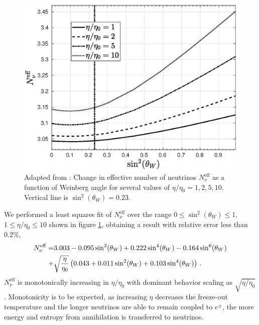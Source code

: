 \begin{figure}[b]
\centerline{\includegraphics[width=0.70\columnwidth]{04-birrell/ParametricStudies/Figures/N_eff2.eps}
}
\caption{Adapted from \cite{Birrell:2014uka}: Change in effective number of neutrinos  $N_\nu^{\mathrm{eff}}$ as a function of Weinberg angle for  several values of $\eta/\eta_0=1,2,5,10$. Vertical line is $\sin^2(\theta_W)=0.23$.}
\label{N_nu_params}  
 \end{figure}
We performed a least squares fit of $N_\nu^{\mathrm{eff}}$ over the range $0\leq \sin^2(\theta_W)\leq 1$, $1\leq \eta/\eta_0\leq 10$ shown in figure \ref{N_nu_params}, obtaining a result with relative error less than $0.2\%$,
\begin{align}
N_\nu^{\mathrm{eff}}=&3.003-0.095\sin^2(\theta_W) +0.222\sin^4(\theta_W ) -0.164\sin^6(\theta_W )\notag\\
+&\sqrt{\frac{\eta}{\eta_0}}\left(0.043+0.011\sin^2(\theta_W) +0.103\sin^4(\theta_W)\right)\,.
\end{align}
$N_\nu^{\mathrm{eff}}$ is monotonically increasing in $\eta/\eta_0$ with dominant behavior  scaling as $\sqrt{ \eta/\eta_0}$. Monotonicity is to be expected, as increasing $\eta$ decreases the freeze-out temperature and the longer neutrinos are able to remain coupled to $e^\pm$, the more energy and entropy from annihilation is transferred to neutrinos.
